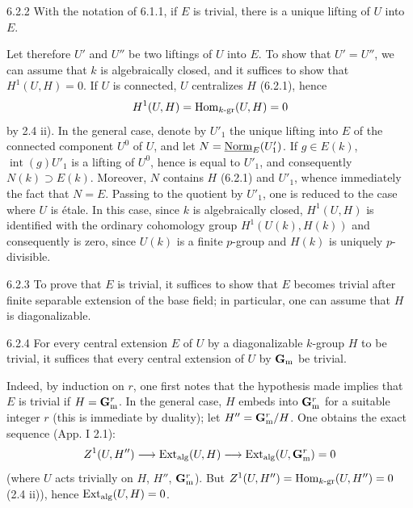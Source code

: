 \begin{lemma}{6.2.2}\label{XVII.6.2.2}
With the notation of 6.1.1, if $E$ is trivial, there is a unique lifting of $U$ into $E$.
\end{lemma}
Let therefore $U'$ and $U''$ be two liftings of $U$ into $E$. To show that $U'=U''$, we can assume that $k$ is algebraically closed, and it suffices to show that $H^1(U,H)=0$. If $U$ is connected, $U$ centralizes $H$ (6.2.1), hence
\[
 H^1(U,H)=\operatorname{Hom}_{k\text{-gr}}(U,H)=0
\]
by 2.4 ii). In the general case, denote by $U'_1$ the unique lifting into $E$ of the connected component $U^0$ of $U$, and let $N=\underline{\mathrm{Norm}}_E(U'_1)$. If $g\in E(k)$, $\operatorname{int}(g)U'_1$ is a lifting of $U^0$, hence is equal to $U'_1$, and consequently $N(k)\supset E(k)$. Moreover, $N$ contains $H$ (6.2.1) and $U'_1$, whence immediately the fact that $N=E$. Passing to the quotient by $U'_1$, one is reduced to the case where $U$ is étale. In this case, since $k$ is algebraically closed, $H^1(U,H)$ is identified with the ordinary cohomology group $H^1(U(k),H(k))$ and consequently is zero, since $U(k)$ is a finite $p$-group and $H(k)$ is uniquely $p$-divisible.

\begin{corollary}{6.2.3}\label{XVII.6.2.3}
To prove that $E$ is trivial, it suffices to show that $E$ becomes trivial after finite separable extension of the base field; in particular, one can assume that $H$ is diagonalizable.
\end{corollary}
\begin{lemma}{6.2.4}\label{XVII.6.2.4}
For every central extension $E$ of $U$ by a diagonalizable $k$-group $H$ to be trivial, it suffices that every central extension of $U$ by $\mathbf{G}_{\mathrm{m}}$ be trivial.
\end{lemma}
Indeed, by induction on $r$, one first notes that the hypothesis made implies that $E$ is trivial if $H=\mathbf{G}_{\mathrm{m}}^r$. In the general case, $H$ embeds into $\mathbf{G}_{\mathrm{m}}^r$ for a suitable integer $r$ (this is immediate by duality); let $H''=\mathbf{G}_{\mathrm{m}}^r/H$. One obtains the exact sequence (App. I 2.1):
\[
 Z^1(U,H'')\longrightarrow\operatorname{Ext}_{\mathrm{alg}}(U,H)\longrightarrow\operatorname{Ext}_{\mathrm{alg}}(U,\mathbf{G}_{\mathrm{m}}^r)=0
\]
(where $U$ acts trivially on $H$, $H''$, $\mathbf{G}_{\mathrm{m}}^r$). But $Z^1(U,H'')=\operatorname{Hom}_{k\text{-gr}}(U,H'')=0$ (2.4 ii)), hence $\operatorname{Ext}_{\mathrm{alg}}(U,H)=0$.

